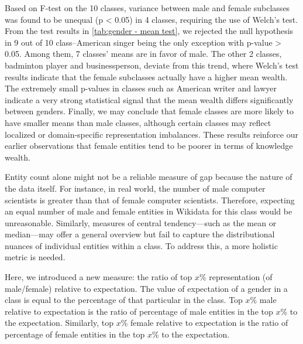 Based on F-test on the 10 classes, variance between male and female subclasses was found to be unequal (p < 0.05) in 4 classes, requiring the use of Welch’s test. From the test results in \autoref{tab:gender - mean test}, we rejected the null hypothesis in 9 out of 10 class--American singer being the only exception with p-value > 0.05. Among them, 7 classes' means are in favor of male. The other 2 classes, badminton player and businessperson, deviate from this trend, where Welch’s test results indicate that the female subclasses actually have a higher mean wealth. The extremely small p-values in classes such as American writer and lawyer indicate a very strong statistical signal that the mean wealth differs significantly between genders. Finally, we may conclude that female classes are more likely to have smaller means than male classes, although certain classes may reflect localized or domain-specific representation imbalances. These results reinforce our earlier observations that female entities tend to be poorer in terms of knowledge wealth.

Entity count alone might not be a reliable measure of gap because the nature of the data itself. For instance, in real world, the number of male computer scientists is greater than that of female computer scientists. Therefore, expecting an equal number of male and female entities in Wikidata for this class would be unreasonable. Similarly, measures of central tendency—such as the mean or median—may offer a general overview but fail to capture the distributional nuances of individual entities within a class. To address this, a more holistic metric is needed.

Here, we introduced a new measure: the ratio of top \(x\)\% representation (of male/female) relative to expectation. The value of expectation of a gender in a class is equal to the percentage of that particular in the class. Top \(x\)\% male relative to expectation is the ratio of percentage of male entities in the top \(x\)\% to the expectation. Similarly, top \(x\)\% female relative to expectation is the ratio of percentage of female entities in the top \(x\)\% to the expectation.

